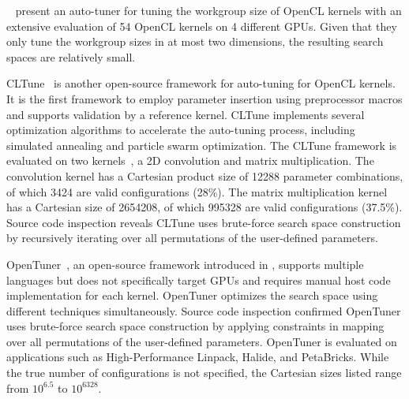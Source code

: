 \citeauthor{Dao}~\cite{Dao} present an auto-tuner for tuning the workgroup size of OpenCL kernels with an extensive evaluation of 54 OpenCL kernels on 4 different GPUs. Given that they only tune the workgroup sizes in at most two dimensions, the resulting search spaces are relatively small. 

CLTune~\cite{CLTune} is another open-source framework for auto-tuning for OpenCL kernels. It is the first framework to employ parameter insertion using preprocessor macros and supports validation by a reference kernel. CLTune implements several optimization algorithms to accelerate the auto-tuning process, including simulated annealing and particle swarm optimization. 
\ifrelatedworktable
\else
The CLTune framework is evaluated on two kernels~\cite{CLTune}, a 2D convolution and matrix multiplication. 
The convolution kernel has a Cartesian product size of 12288 parameter combinations, of which 3424 are valid configurations (28\%).
The matrix multiplication kernel has a Cartesian size of 2654208, of which 995328 are valid configurations (37.5\%).
Source code inspection reveals CLTune uses brute-force search space construction by recursively iterating over all permutations of the user-defined parameters. %
\fi

OpenTuner~\cite{OpenTuner}, an open-source framework introduced in \citeyear{OpenTuner}, supports multiple languages but does not specifically target GPUs and requires manual host code implementation for each kernel. OpenTuner optimizes the search space using different techniques simultaneously. %
Source code inspection confirmed OpenTuner uses brute-force search space construction by applying constraints in mapping over all permutations of the user-defined parameters. %
\ifrelatedworktable
\else
OpenTuner is evaluated on applications such as High-Performance Linpack, Halide, and PetaBricks. While the true number of configurations is not specified, the Cartesian sizes listed range from $10^{6.5}$ to $10^{6328}$. 
\fi

